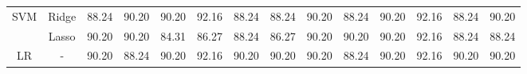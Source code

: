 \begin{landscape}
\begin{table}[]
{\begin{tabular}{cc|clllllclllll}
				\multirow{2}{*}{SVM}            & Ridge                                 & 88.24                                                             & 90.20                                                                & 90.20                                                                & 92.16                                                               & 88.24                                                            & \multicolumn{1}{c|}{88.24}                                                                   & 90.20                                                             & 88.24                                                                & 90.20                                                                & 92.16                                                               & 88.24                                                            & 90.20                                                                   \\
				& Lasso                                 & 90.20                                                             & 90.20                                                                & 84.31                                                                & 86.27                                                               & 88.24                                                            & \multicolumn{1}{c|}{86.27}                                                                   & 90.20                                                             & 90.20                                                                & 90.20                                                                & 92.16                                                               & 88.24                                                            & 88.24                                                                   \\ \hline
				\multirow{3}{*}{LR}             & -                                     & 90.20                                                             & 88.24                                                                & 90.20                                                                & 92.16                                                               & 90.20                                                            & \multicolumn{1}{c|}{90.20}                                                                   & 90.20                                                             & 88.24                                                                & 90.20                                                                & 92.16                                                               & 90.20                                                            & 90.20                                                                   \\

\end{tabular}}
\end{table}
\end{landscape}
